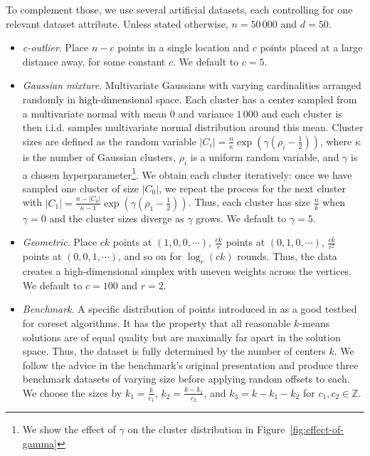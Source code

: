 To complement those, we use several artificial datasets, each controlling for one relevant dataset attribute. Unless stated otherwise, $n = 50\,000$
and $d=50$.
\begin{itemize}
    \item \emph{c-outlier}. Place $n-c$ points in a single location and $c$ points placed at a large distance away, for some constant $c$. We default to $c=5$.

    \item \emph{Gaussian mixture}.  Multivariate Gaussians with varying cardinalities arranged randomly in high-dimensional space.  Each cluster has a center
        sampled from a multivariate normal with mean $0$ and variance $1\,000$ and each cluster is then i.i.d. samples multivariate normal distribution around
        this mean. Cluster sizes are defined as the random variable $|C_i| = \frac{n}{\kappa} \exp \left( \gamma(\rho_i - \frac{1}{2}) \right)$, where $\kappa$
        is the number of Gaussian clusters, $\rho_i$ is a uniform random variable, and $\gamma$ is a chosen hyperparameter\footnote{We show the effect of
        $\gamma$ on the cluster distribution in Figure~\ref{fig:effect-of-gamma}}. We obtain each cluster iteratively: once we have sampled one cluster of size
        $|C_0|$, we repeat the process for the next cluster with $|C_1| = \frac{n - |C_0|}{\kappa-1}\exp \left( \gamma(\rho_1 - \frac{1}{2}) \right)$.  Thus,
        each cluster has size $\frac{n}{k}$ when $\gamma = 0$ and the cluster sizes diverge as $\gamma$ grows. We default to $\gamma = 5$.

    \item \emph{Geometric}. Place $c k$ points at $(1, 0, 0, \cdots)$, $\frac{ck}{r}$ points at $(0, 1, 0, \cdots)$, $\frac{ck}{r^2}$ points
        at $(0, 0, 1, \cdots)$, and so on for $\log_r (ck)$ rounds. Thus, the data creates a high-dimensional simplex with uneven weights across the vertices. We
        default to $c = 100$ and $r=2$. 

    \item \emph{Benchmark}. A specific distribution of points introduced in \cite{chrisESA} as a good testbed for coreset algorithms.  It has the property that
        all reasonable $k$-means solutions are of equal quality but are maximally far apart in the solution space. Thus, the dataset is fully determined by the
        number of centers $k$. We follow the advice in the benchmark's original presentation and produce three benchmark datasets of varying size before
        applying random offsets to each. We choose the sizes by $k_1 = \frac{k}{c_1}$, $k_2 = \frac{k - k_1}{c_2}$, and $k_3 = k - k_1 - k_2$ for $c_1, c_2 \in
        \mathbb{Z}$.

\end{itemize}

